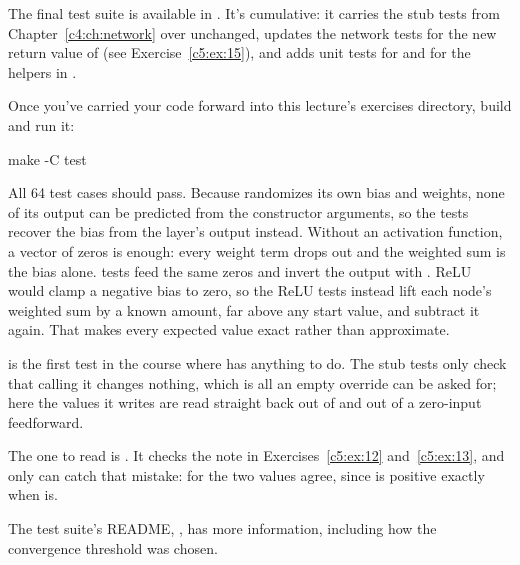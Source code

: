 \label{c5:ex:17}
The final test suite is available in . It's cumulative:
it carries the stub tests from Chapter~\ref{c4:ch:network} over unchanged, updates the network
tests for the new return value of  (see Exercise~\ref{c5:ex:15}), and adds unit tests
for  and for the helpers in .

Once you've carried your code forward into this lecture's exercises directory, build and run it:

\begin{shell}
make -C test
\end{shell}

\noindent All 64 test cases should pass. Because  randomizes its own bias and weights,
none of its output can be predicted from the constructor arguments, so the tests recover the bias
from the layer's output instead. Without an activation function, a vector of zeros is enough: every
weight term drops out and the weighted sum is the bias alone.  tests feed the same zeros
and invert the output with . ReLU would clamp a negative bias to zero, so the
ReLU tests instead lift each node's weighted sum by a known amount, far above any start value, and
subtract it again. That makes every expected value exact rather than approximate.

 is the first test in the course where  has
anything to do. The stub tests only check that calling it changes nothing, which is all an empty
override can be asked for; here the values it writes are read straight back out of
 and out of a zero-input feedforward.

The one to read is . It checks the note in
Exercises~\ref{c5:ex:12} and~\ref{c5:ex:13}, and only  can catch that mistake:
for  the two values agree, since  is positive exactly when 
is.

The test suite's README, , has more
information, including how the convergence threshold was chosen.

